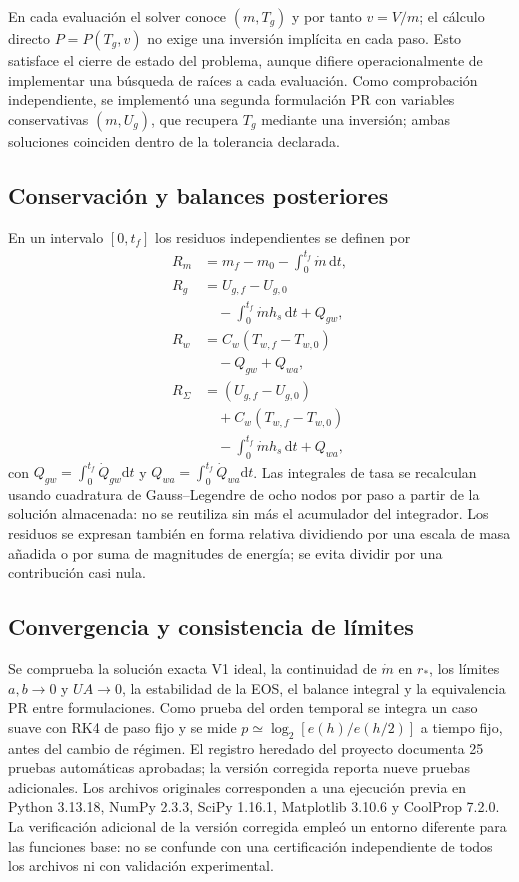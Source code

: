 \documentclass[11pt,letterpaper]{article}
\newcommand{\dd}{\mathrm{d}}
\begin{document}
En cada evaluación el solver conoce $(m,T_g)$ y por tanto $v=V/m$; el cálculo directo $P=P(T_g,v)$ no exige una inversión implícita en cada paso. Esto satisface el cierre de estado del problema, aunque difiere operacionalmente de implementar una búsqueda de raíces a cada evaluación. Como comprobación independiente, se implementó una segunda formulación PR con variables conservativas $(m,U_g)$, que recupera $T_g$ mediante una inversión; ambas soluciones coinciden dentro de la tolerancia declarada.

\subsection{Conservación y balances posteriores}
En un intervalo $[0,t_f]$ los residuos independientes se definen por
\begin{align}
R_m&=m_f-m_0-\int_0^{t_f}\dot m\,\dd t,\\
R_g&=U_{g,f}-U_{g,0}\nonumber\\&\quad-\int_0^{t_f}\dot m h_s\,\dd t+Q_{gw},\\
R_w&=C_w(T_{w,f}-T_{w,0})\nonumber\\&\quad-Q_{gw}+Q_{wa},\\
R_\Sigma&=(U_{g,f}-U_{g,0})\nonumber\\&\quad+C_w(T_{w,f}-T_{w,0})\nonumber\\&\quad-\int_0^{t_f}\dot m h_s\,\dd t+Q_{wa},\label{eq:resid}
\end{align}
con $Q_{gw}=\int_0^{t_f}\dot Q_{gw}\dd t$ y $Q_{wa}=\int_0^{t_f}\dot Q_{wa}\dd t$. Las integrales de tasa se recalculan usando cuadratura de Gauss--Legendre de ocho nodos por paso a partir de la solución almacenada: no se reutiliza sin más el acumulador del integrador. Los residuos se expresan también en forma relativa dividiendo por una escala de masa añadida o por suma de magnitudes de energía; se evita dividir por una contribución casi nula.

\subsection{Convergencia y consistencia de límites}
Se comprueba la solución exacta V1 ideal, la continuidad de $\dot m$ en $r_*$, los límites $a,b\to0$ y $UA\to0$, la estabilidad de la EOS, el balance integral y la equivalencia PR entre formulaciones. Como prueba del orden temporal se integra un caso suave con RK4 de paso fijo y se mide $p\simeq\log_2[e(h)/e(h/2)]$ a tiempo fijo, antes del cambio de régimen. El registro heredado del proyecto documenta 25 pruebas automáticas aprobadas; la versión corregida reporta nueve pruebas adicionales. Los archivos originales corresponden a una ejecución previa en Python 3.13.18, NumPy 2.3.3, SciPy 1.16.1, Matplotlib 3.10.6 y CoolProp 7.2.0. La verificación adicional de la versión corregida empleó un entorno diferente para las funciones base: no se confunde con una certificación independiente de todos los archivos ni con validación experimental.
\end{document}
